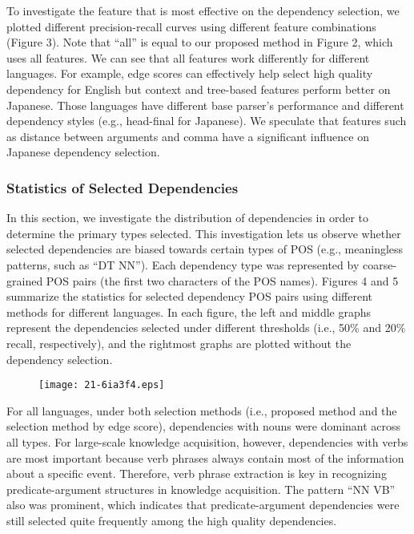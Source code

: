 \documentclass[english]{jnlp_1.4}
\begin{document}
To investigate the feature that is most effective on the dependency selection,
we plotted different precision-recall curves using different feature combinations (Figure 3).
Note that ``all'' is equal to our proposed method in Figure 2, which uses all features.
We can see that all features work differently for different languages.
For example, edge scores can effectively help select high quality dependency for English but context and tree-based features perform better on Japanese.
Those languages have different base parser's performance and different dependency styles (e.g., head-final for Japanese).
We speculate that features such as distance between arguments and comma have a significant influence on Japanese dependency selection.


\subsubsection{Statistics of Selected Dependencies }

In this section, we investigate the distribution of dependencies in order to determine the primary types selected.
This investigation lets us observe whether selected dependencies are biased towards certain types of POS (e.g., meaningless patterns, such as ``DT NN'').
Each dependency type was represented by coarse-grained POS pairs (the first two characters of the POS
names). Figures 4 and 5 summarize the statistics for selected dependency POS pairs
using different methods for different languages. In each figure, the left and middle
graphs represent the dependencies selected under different thresholds (i.e., 50\% and 20\% recall, respectively),
and the rightmost graphs are plotted without the dependency selection.

\begin{figure}[b]
\begin{center}
\texttt{[image: 21-6ia3f4.eps]}
\end{center}
\end{figure}

For all languages, under both selection methods (i.e., proposed method and the selection method by edge score), dependencies with nouns were dominant across all types.
For large-scale knowledge acquisition, however, dependencies with verbs
are most important because verb phrases always contain most of the
information about a specific event. Therefore, verb phrase extraction is key in recognizing predicate-argument 
structures in knowledge acquisition.
The pattern ``NN VB'' also was prominent, which indicates that 
predicate-argument dependencies were still selected quite frequently among the high quality
dependencies.
\end{document}
